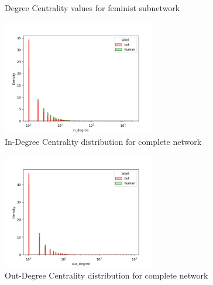 \documentclass[12pt, a4paper]{article}
\begin{document}
\begin{itemize}
\begin{figure}[H]
    				\caption{Degree Centrality values for feminist subnetwork}
				\end{figure}
                \begin{figure}[H]
                    \centering
                    \includegraphics[width=0.6\textwidth]{complete_in_degree_distribution.png}
                    \caption{In-Degree Centrality distribution for complete network}
                    \label{fig:in-degree}
                \end{figure}
                \begin{figure}[H]
                    \centering
                    \includegraphics[width=0.6\textwidth]{complete_out_degree_distribution.png}
                    \caption{Out-Degree Centrality distribution for complete network}
                    \label{fig:out-degree}
                \end{figure}
				\begin{figure}[H]
    				\centering
    				\begin{minipage}[b]{0.49\textwidth}    				
        				\centering
        				\setlength{\fboxsep}{0pt}
    					\setlength{\fboxrule}{0.5pt}

\end{minipage}
\end{figure}
\end{itemize}
\end{document}
